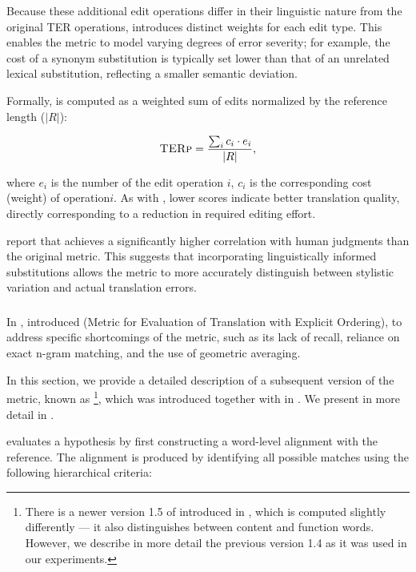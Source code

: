 Because these additional edit operations differ in their linguistic nature from the original TER operations, \terp introduces distinct weights for each edit type. This enables the metric to model varying degrees of error severity; for example, the cost of a synonym substitution is typically set lower than that of an unrelated lexical substitution, reflecting a smaller semantic deviation. 

Formally, \terp is computed as a weighted sum of edits normalized by the reference length ($|R|$):

$$\textsc{TERp} = \frac{\sum_i c_i \cdot e_i}{|R|},$$

where $e_i$ is the number of the edit operation $i$,  $c_i$ is the corresponding cost (weight) of operation$i$.
As with \ter, lower \terp scores indicate better translation quality, directly corresponding to a reduction in required editing effort. 

\citet{snover-etal-2009-fluency} report that \terp achieves a significantly higher correlation with human judgments than the original \ter metric. This suggests that incorporating linguistically informed substitutions allows the metric to more accurately distinguish between stylistic variation and actual translation errors.

\subsubsection{\mn}
\label{rw:meteor}
In \citeyear{banerjee-lavie-2005-meteor}, \citeauthor{banerjee-lavie-2005-meteor} introduced \meteor (Metric for Evaluation of Translation with Explicit Ordering),  to address specific shortcomings of the \bleu metric, such as its lack of recall, reliance on exact n-gram matching, and the use of geometric averaging.

In this section, we provide a detailed description of a subsequent version of the \meteor metric, known as \mn\footnote{There is a newer version 1.5 of \mn introduced in \cite{denkowski-lavie-2014-meteor}, which is computed slightly differently --- it also distinguishes between content and function words. However, we describe in more detail the previous version 1.4 as it was used in our experiments.}, which was introduced together with \mpt in \cite{meteor-tables}. We present \mpt in more detail in .

\mn evaluates a hypothesis by first constructing a word-level alignment with the reference. The alignment is produced by identifying all possible matches using the following hierarchical criteria:

